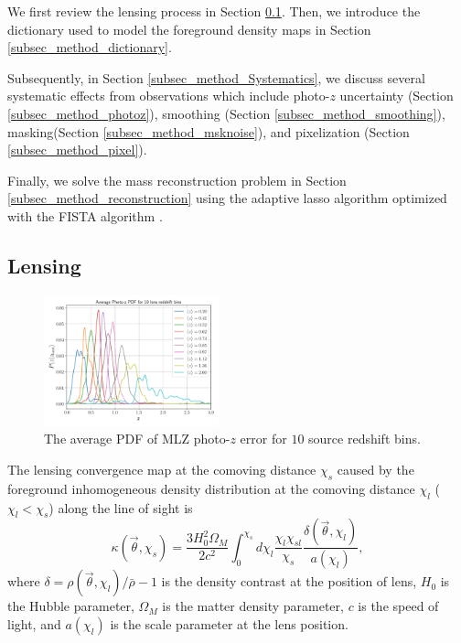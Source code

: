 \documentclass[twocolumn]{aastex62}
\begin{document}
We first review the lensing process in Section \ref{subsec_method_delta2shear}.
Then, we introduce the dictionary used to model the foreground density maps in
Section \ref{subsec_method_dictionary}.

Subsequently, in Section \ref{subsec_method_Systematics}, we discuss several
systematic effects from observations which include photo-$z$ uncertainty
(Section \ref{subsec_method_photoz}), smoothing (Section
\ref{subsec_method_smoothing}), masking(Section \ref{subsec_method_msknoise}),
and pixelization (Section \ref{subsec_method_pixel}).

Finally, we solve the mass reconstruction problem in Section
\ref{subsec_method_reconstruction} using the adaptive lasso algorithm
\citep{AdaLASSO-Zou2006} optimized with the FISTA algorithm
\citep{FISTA-Beck2009}.


\subsection{Lensing}
\label{subsec_method_delta2shear}

\begin{figure}
 \centering
 \includegraphics[width=0.45\textwidth]{mlz-poz.pdf}
 \caption{The average PDF of MLZ photo-$z$ error for $10$ source redshift bins.
        }\label{fig_pdfpz}
\end{figure}

The lensing convergence map at the comoving distance $\chi_s$ caused by the
foreground inhomogeneous density distribution at the comoving distance $\chi_l$
($\chi_l< \chi_s$) along the line of sight is
\begin{equation}
\kappa(\vec{\theta},\chi_s)=\frac{3H_0^2\Omega_M}{2 c^2} \int_0^{\chi_s} d\chi_l \frac{\chi_l \chi_{sl}}{\chi_s}
\frac{\delta(\vec{\theta},\chi_l)}{a(\chi_l)},
\end{equation}
where $\delta=\rho(\vec{\theta},\chi_l)/\bar{\rho}-1$ is the density contrast
at the position of lens, $H_0$ is the Hubble parameter, $\Omega_M$ is the
matter density parameter, $c$ is the speed of light, and $a(\chi_l)$ is the
scale parameter at the lens position.
\end{document}
